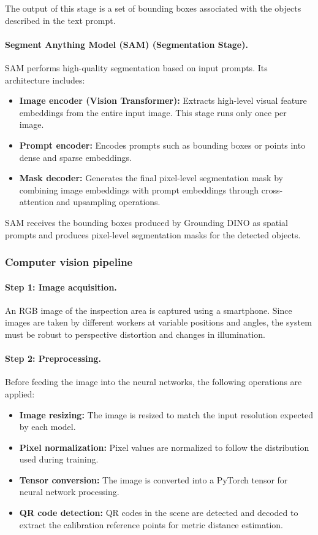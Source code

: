 \documentclass[11pt]{article}
\begin{document}
The output of this stage is a set of bounding boxes associated with the objects described 
in the text prompt.

\paragraph{Segment Anything Model (SAM) (Segmentation Stage).}
SAM performs high-quality segmentation based on input prompts. Its architecture includes:

\begin{itemize}
    \item \textbf{Image encoder (Vision Transformer):} Extracts high-level visual feature 
    embeddings from the entire input image. This stage runs only once per image.
    \item \textbf{Prompt encoder:} Encodes prompts such as bounding boxes or points 
    into dense and sparse embeddings.
    \item \textbf{Mask decoder:} Generates the final pixel-level segmentation mask by 
    combining image embeddings with prompt embeddings through cross-attention and 
    upsampling operations.
\end{itemize}

SAM receives the bounding boxes produced by Grounding DINO as spatial prompts and 
produces pixel-level segmentation masks for the detected objects.

\subsubsection{Computer vision pipeline}

\paragraph{Step 1: Image acquisition.}
An RGB image of the inspection area is captured using a smartphone. Since images are 
taken by different workers at variable positions and angles, the system must be robust to 
perspective distortion and changes in illumination.

\paragraph{Step 2: Preprocessing.}
Before feeding the image into the neural networks, the following operations are applied:
\begin{itemize}
    \item \textbf{Image resizing:} The image is resized to match the input resolution 
    expected by each model.
    \item \textbf{Pixel normalization:} Pixel values are normalized to follow the 
    distribution used during training.
    \item \textbf{Tensor conversion:} The image is converted into a PyTorch tensor for 
    neural network processing.
    \item \textbf{QR code detection:} QR codes in the scene are detected and decoded 
    to extract the calibration reference points for metric distance estimation.
\end{itemize}
\end{document}
